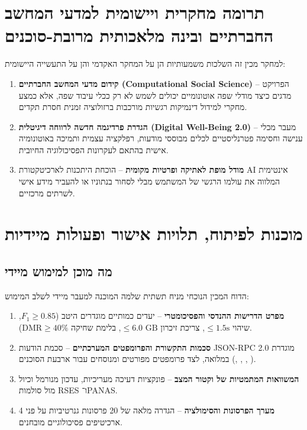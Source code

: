 \section{תרומה מחקרית ויישומית למדעי המחשב החברתיים ובינה מלאכותית מרובת-סוכנים}
\label{sec:conclusion_impact}
למחקר מכין זה השלכות משמעותיות הן על המחקר האקדמי והן על התעשייה היישומית:
\begin{enumerate}
    \item \textbf{קידום מדעי המחשב החברתיים (\textenglish{Computational Social Science})} -- הפרויקט מדגים כיצד מודלי שפה אוטונומיים יכולים לשמש לא רק ככלי עיבוד שפה, אלא כמצע מחקרי למידול דינמיקות רגשיות מורכבות ברזולוציה זמנית חסרת תקדים.
    \item \textbf{הגדרת פרדיגמה חדשה לרווחה דיגיטלית (\textenglish{Digital Well-Being 2.0})} -- מעבר מכלי ענישה וחסימה פטרנליסטיים לכלים מבוססי מודעות, רפלקציה עצמית ותמיכה באוטונומיה אישית בהתאם לעקרונות הפסיכולוגיה החיובית.
    \item \textbf{מודל מופת לאתיקה ופרטיות מקומית} -- הוכחת היתכנות לארכיטקטורת AI אינטימית המלווה את עולמו הרגשי של המשתמש מבלי לסחור בנתוניו או להעביר מידע אישי לשרתים מרכזיים.
\end{enumerate}

\section{מוכנות לפיתוח, תלויות אישור ופעולות מיידיות}
\label{sec:conclusion_readiness_next_steps}

\subsection{מה מוכן למימוש מיידי}
הדוח המכין הנוכחי מניח תשתית שלמה המוכנה למעבר מיידי לשלב המימוש:
\begin{enumerate}
    \item \textbf{מפרט הדרישות ההנדסי והפסיכומטרי} -- יעדים כמותיים מוגדרים היטב ($F_1 \ge 0.85$, שיהוי $\le 1.5\text{s}$, צריכת זיכרון $\le 6.0\text{ GB}$, בלימת שחיקה $\text{DMR} \ge 40\%$).
    \item \textbf{סכמות התקשורת והפרומפטים המערכתיים} -- סכמת הודעות \textenglish{JSON-RPC 2.0} מוגדרת במלואה, לצד פרומפטים מפורטים ומנוסחים עבור ארבעת הסוכנים (\agentObserver{}, \agentAnalyst{}, \agentReflector{}, \agentInterventionist{}).
    \item \textbf{המשוואות המתמטיות של וקטור המצב} -- פונקציות דעיכה מעריכיות, עדכון מנורמל וכיול מול סולמות \textenglish{RSES} ו־\textenglish{PANAS}.
    \item \textbf{מערך הפרסונות והסימולציה} -- הגדרה מלאה של 20 פרסונות גנרטיביות על פני 4 ארכיטיפים פסיכולוגיים מובחנים.
\end{enumerate}

